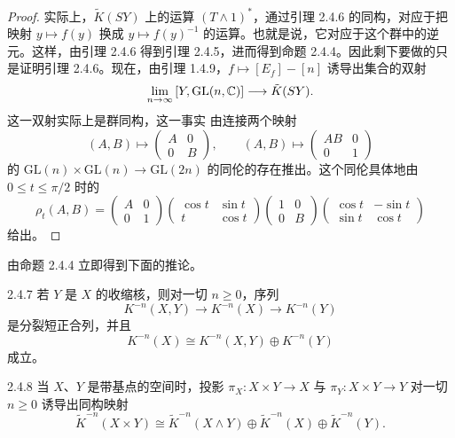\begin{proof}
  实际上，$\tilde K(SY)$ 上的运算 $(T\wedge1)^*$，通过引理 2.4.6 的同构，对应于把映射 $y\mapsto f(y)$ 换成 $y\mapsto f(y)^{-1}$ 的运算。也就是说，它对应于这个群中的逆元。这样，由引理 2.4.6 得到引理 2.4.5，进而得到命题 2.4.4。因此剩下要做的只是证明引理 2.4.6。现在，由引理 1.4.9，$f\mapsto[E_f]-[n]$ 诱导出集合的双射
  \[
  \lim_{n\to\infty}\,[Y,\mathrm{GL}(n,\mathbb{C})]\longrightarrow\tilde K(SY).
  \]
  这一双射实际上是群同构，这一事实
  由连接两个映射
  \[
  (A,B)\longmapsto\begin{pmatrix}A&0\\0&B\end{pmatrix},
  \qquad
  (A,B)\longmapsto\begin{pmatrix}AB&0\\0&1\end{pmatrix}
  \]
  的 $\mathrm{GL}(n)\times\mathrm{GL}(n)\to\mathrm{GL}(2n)$ 的同伦的存在推出。这个同伦具体地由 $0\le t\le\pi/2$ 时的
  \[
  \rho_t(A,B)=
  \begin{pmatrix}A&0\\0&1\end{pmatrix}
  \begin{pmatrix}\cos t&\sin t\\ t&\cos t\end{pmatrix}
  \begin{pmatrix}1&0\\0&B\end{pmatrix}
  \begin{pmatrix}\cos t&-\sin t\\\sin t&\cos t\end{pmatrix}
  \]
  给出。
\end{proof}

由命题 2.4.4 立即得到下面的推论。

\begin{corollary*}{2.4.7}
  若 $Y$ 是 $X$ 的收缩核，则对一切 $n\ge0$，序列
  \[
  K^{-n}(X,Y)\longrightarrow K^{-n}(X)\longrightarrow K^{-n}(Y)
  \]
  是分裂短正合列，并且
  \[
  K^{-n}(X)\cong K^{-n}(X,Y)\oplus K^{-n}(Y)
  \]
  成立。
\end{corollary*}

\begin{corollary*}{2.4.8}
  当 $X$、$Y$ 是带基点的空间时，投影 $\pi_X\colon X\times Y\to X$ 与 $\pi_Y\colon X\times Y\to Y$ 对一切 $n\ge0$ 诱导出同构映射
  \[
  \tilde K^{-n}(X\times Y)\cong\tilde K^{-n}(X\wedge Y)\oplus\tilde K^{-n}(X)\oplus\tilde K^{-n}(Y).
  \]
\end{corollary*}

